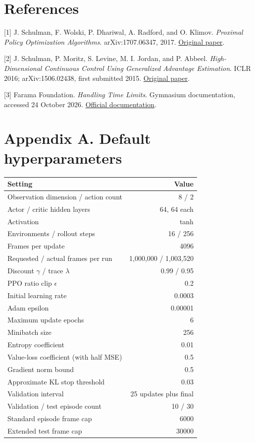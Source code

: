 \documentclass[
  11pt,
]{article}
\newcounter{none} %
\begin{document}
\section{References}\label{references}

{[}1{]} J. Schulman, F. Wolski, P. Dhariwal, A. Radford, and O. Klimov.
\emph{Proximal Policy Optimization Algorithms}. arXiv:1707.06347, 2017.
\href{https://arxiv.org/abs/1707.06347}{Original paper}.

{[}2{]} J. Schulman, P. Moritz, S. Levine, M. I. Jordan, and P. Abbeel.
\emph{High-Dimensional Continuous Control Using Generalized Advantage
Estimation}. ICLR 2016; arXiv:1506.02438, first submitted 2015.
\href{https://arxiv.org/abs/1506.02438}{Original paper}.

{[}3{]} Farama Foundation. \emph{Handling Time Limits}. Gymnasium
documentation, accessed 24 October 2026.
\href{https://gymnasium.farama.org/tutorials/gymnasium_basics/handling_time_limits/}{Official
documentation}.

\section{Appendix A. Default
hyperparameters}\label{appendix-a.-default-hyperparameters}

{\def\LTcaptype{none} %
\begin{longtable}[]{@{}lr@{}}
\toprule\noalign{}
Setting & Value \\
\midrule\noalign{}
\endhead
\bottomrule\noalign{}
\endlastfoot
Observation dimension / action count & 8 / 2 \\
Actor / critic hidden layers & 64, 64 each \\
Activation & tanh \\
Environments / rollout steps & 16 / 256 \\
Frames per update & 4096 \\
Requested / actual frames per run & 1,000,000 / 1,003,520 \\
Discount \(\gamma\) / trace \(\lambda\) & 0.99 / 0.95 \\
PPO ratio clip \(\epsilon\) & 0.2 \\
Initial learning rate & 0.0003 \\
Adam epsilon & 0.00001 \\
Maximum update epochs & 6 \\
Minibatch size & 256 \\
Entropy coefficient & 0.01 \\
Value-loss coefficient (with half MSE) & 0.5 \\
Gradient norm bound & 0.5 \\
Approximate KL stop threshold & 0.03 \\
Validation interval & 25 updates plus final \\
Validation / test episode count & 10 / 30 \\
Standard episode frame cap & 6000 \\
Extended test frame cap & 30000 \\
\end{longtable}
}
\end{document}
